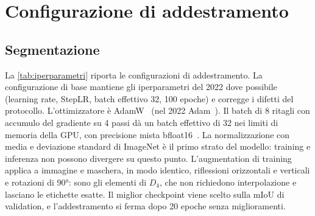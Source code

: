 \section{Configurazione di addestramento}
\label{sec:addestramento}

\subsection{Segmentazione}

La \cref{tab:iperparametri} riporta le configurazioni di addestramento. La configurazione di base
mantiene gli iperparametri del 2022 dove possibile (learning rate, StepLR, batch effettivo 32,
100 epoche) e corregge i difetti del protocollo. L'ottimizzatore è AdamW~\cite{loshchilov2019adamw}
(nel 2022 Adam~\cite{kingma2015adam}). Il batch di 8 ritagli con accumulo del gradiente su 4 passi
dà un batch effettivo di 32 nei limiti di memoria della GPU, con precisione mista
bfloat16~\cite{micikevicius2018mixed}. La normalizzazione con media e deviazione standard di
ImageNet è il primo strato del modello: training e inferenza non possono divergere su questo
punto. L'augmentation di training applica a immagine e maschera, in modo identico, riflessioni
orizzontali e verticali e rotazioni di \ang{90}: sono gli elementi di $D_4$, che non richiedono
interpolazione e lasciano le etichette esatte. Il miglior checkpoint viene scelto sulla mIoU di
validation, e l'addestramento si ferma dopo 20 epoche senza miglioramenti.


